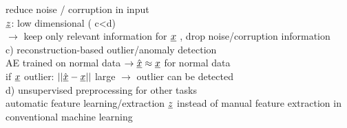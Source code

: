 reduce noise / corruption in input\\
$  {\underline z}  $: low dimensional ( c<d) \\
$ \rightarrow $ keep only relevant information for $ {\underline x} $ , drop noise/corruption information\\
 c) reconstruction-based outlier/anomaly detection\\
\textbullet AE trained on normal data $ \rightarrow  \hat{{\underline x}} \approx {\underline x} $ for normal data \\
\textbullet if $  {\underline x} $ outlier:  $  || \hat{{\underline x}} - {\underline x} || $ large $ \rightarrow $ outlier can be detected \\
 d) unsupervised preprocessing for other tasks\\
 \textbullet automatic feature learning/extraction $  {\underline z} $ instead of manual feature extraction in conventional machine learning\\


